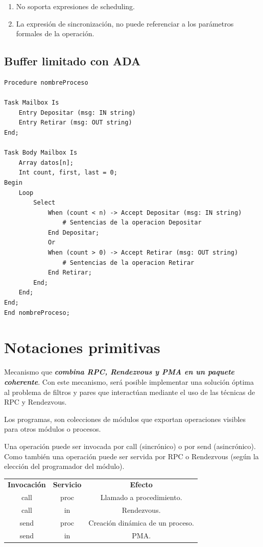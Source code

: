 \documentclass[a4paper, 10pt]{report}
\begin{document}
\begin{enumerate}
	\item No soporta expresiones de scheduling.
	\item La expresión de sincronización, no puede referenciar a los parámetros formales de la operación.
\end{enumerate}

\subsection{Buffer limitado con ADA}

\begin{lstlisting}
Procedure nombreProceso

Task Mailbox Is
	Entry Depositar (msg: IN string)
	Entry Retirar (msg: OUT string)
End;
	
Task Body Mailbox Is
	Array datos[n];
	Int count, first, last = 0;
Begin
	Loop
		Select
			When (count < n) -> Accept Depositar (msg: IN string)
				# Sentencias de la operacion Depositar
			End Depositar;
			Or
			When (count > 0) -> Accept Retirar (msg: OUT string)
				# Sentencias de la operacion Retirar
			End Retirar;
		End;
	End;
End;
End nombreProceso;
\end{lstlisting}

\section{Notaciones primitivas}

Mecanismo que \textbf{\emph{combina RPC, Rendezvous y PMA en un paquete coherente}}. Con este mecanismo, será posible implementar una solución óptima al problema de filtros y pares que interactúan mediante el uso de las técnicas de RPC y Rendezvous.

Los programas, son colecciones de módulos que exportan operaciones visibles para otros módulos o procesos.

Una operación puede ser invocada por call (sincrónico) o por send (asincrónico). Como también una operación puede ser servida por RPC o Rendezvous (según la elección del programador del módulo).

{\renewcommand{\arraystretch}{2}%
\begin{center}
	\begin{tabular}{c c c}
	\textbf{Invocación} &  \textbf{Servicio} & \textbf{Efecto} \\
	call & proc & Llamado a procedimiento. \\
	\hline
	call & in & Rendezvous. \\
	\hline
	send & proc & Creación dinámica de un proceso. \\
	\hline
	send & in & PMA. \\
\end{tabular}
\end{center}}
\end{document}
